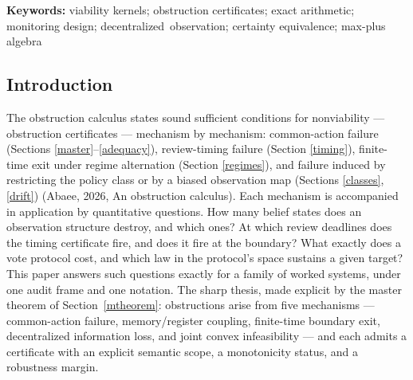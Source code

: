 \documentclass[10pt,twocolumn]{article}
\theoremstyle{definition}
\begin{document}
\begin{abstract}
operation loses exactly the pairs containing the corner state
\((1,1)\). The biased certainty-equivalence law has
drift at least \(21/100\) on \([1,2]\); the bias-free law has drift
identically zero. The benchmark's critical aggregate is \(Y^{*} = 27/5\) (feasible,
margin \(0\)); at the audited obstructed aggregate \(Y = 6\) a
rational dual certificate prices the shortfall at margin \(3/50\). Static duality
holds at value \(-1/10\) on the two-floor instance with an \(\ell_1\)-normalized
Farkas pair, and a Helly-tight triple exhibits the sparse \(m{+}1\)-constraint witness. The complete result tables are carried here: the master table
of all 36 belief pairs against the five kernels, the sixteen sustaining
law pairs of the decentralized protocol (an exact \(4 \times 4\)
product), the 93-cell timing grid, the fifteen-partition census with
each fibre's common safe-action set, and the benchmark and drift tables,
with a five-figure set regenerated from the same scripts. Design rules
follow: review deadlines are boundary-inclusive; merged fibres call for
splits, not threshold tuning; aggregated indices support certainly-safe
reporting only; biased observation maps call for structural correction.
\end{abstract}

\textbf{Keywords:} viability kernels; obstruction certificates; exact
arithmetic; monitoring design; \mbox{decentralized observation}; certainty
equivalence; max-plus algebra

\subsection{Introduction}\label{introduction}

The obstruction calculus states sound sufficient conditions for
nonviability --- obstruction certificates --- mechanism by mechanism:
common-action failure (Sections \ref{master}--\ref{adequacy}),
review-timing failure (Section \ref{timing}), finite-time exit under
regime alternation (Section \ref{regimes}), and failure induced by
restricting the policy class or by a biased observation map
(Sections \ref{classes}, \ref{drift}) (Abaee, 2026, An obstruction calculus). Each mechanism is
accompanied in application by quantitative questions. How many belief
states does an observation structure destroy, and which ones? At which
review deadlines does the timing certificate fire, and does it fire at
the boundary? What exactly does a vote protocol cost, and which law in
the protocol's space sustains a given target? This paper answers such
questions exactly for a family of worked systems, under one audit frame
and one notation. The sharp thesis, made explicit by the master
theorem of Section~\ref{mtheorem}: obstructions arise from five
mechanisms --- common-action failure, memory/register coupling,
finite-time boundary exit, decentralized information loss, and joint
convex infeasibility --- and each admits a certificate with an explicit
semantic scope, a monotonicity status, and a robustness margin.
\end{document}
